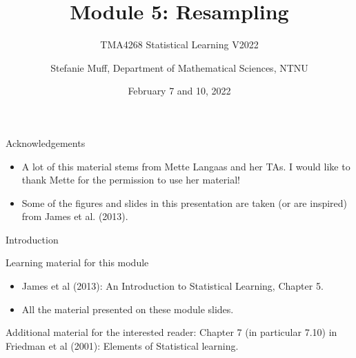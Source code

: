 \documentclass[10pt,ignorenonframetext,]{beamer}
\title{Module 5: Resampling}
\subtitle{TMA4268 Statistical Learning V2022}
\author{Stefanie Muff, Department of Mathematical Sciences, NTNU}
\date{February 7 and 10, 2022}
\begin{document}
\frame{\titlepage}

\begin{frame}{Acknowledgements}
\protect\hypertarget{acknowledgements}{}

\begin{itemize}
\item
  A lot of this material stems from Mette Langaas and her TAs. I would
  like to thank Mette for the permission to use her material!
\item
  Some of the figures and slides in this presentation are taken (or are
  inspired) from James et al. (2013).
\end{itemize}

\end{frame}

\begin{frame}{Introduction}
\protect\hypertarget{introduction}{}

\begin{block}{Learning material for this module}

\vspace{2mm}

\begin{itemize}
\item
  James et al (2013): An Introduction to Statistical Learning, Chapter
  5.
\item
  All the material presented on these module slides.
\end{itemize}

\vspace{2mm}

Additional material for the interested reader: Chapter 7 (in particular
7.10) in Friedman et al (2001): Elements of Statistical learning.

\end{block}

\end{frame}
\end{document}
